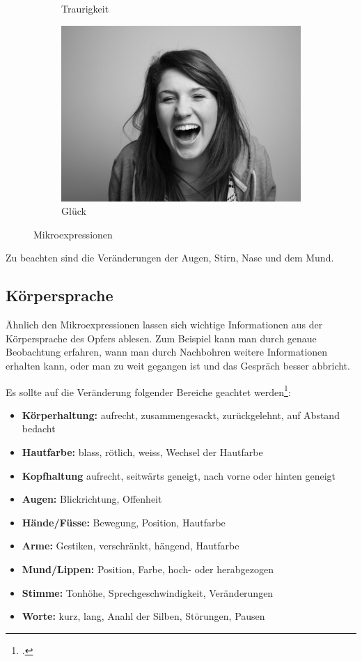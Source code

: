 \begin{figure}[htb]
\begin{subfigure}[b]{.30\linewidth}
		\caption{Traurigkeit}
		\label{fig:socialengineering:weiteretechniken:mikroexpressionen:traurigkeit}
	\end{subfigure}
	\begin{subfigure}[b]{.30\linewidth}
		\centering
		\includegraphics[width=0.5\linewidth]{images/mikroexpression-glueck.jpg}
		\caption{Glück}
		\label{fig:socialengineering:weiteretechniken:mikroexpressionen:glueck}
	\end{subfigure}
  \caption{Mikroexpressionen}
  \label{fig:socialengineering:weiteretechniken:mikroexpressionen}
\end{figure}

Zu beachten sind die Veränderungen der Augen, Stirn, Nase und dem Mund. 

\subsection{Körpersprache}
Ähnlich den Mikroexpressionen lassen sich wichtige Informationen aus der Körpersprache des Opfers ablesen. Zum Beispiel kann man durch genaue Beobachtung erfahren, wann man durch Nachbohren weitere Informationen erhalten kann, oder man zu weit gegangen ist und das Gespräch besser abbricht.

Es sollte auf die Veränderung folgender Bereiche geachtet werden\footcite{human_hacking}:
\begin{itemize}
\item \textbf{Körperhaltung:} aufrecht, zusammengesackt, zurückgelehnt, auf Abstand bedacht
\item \textbf{Hautfarbe:} blass, rötlich, weiss, Wechsel der Hautfarbe
\item \textbf{Kopfhaltung} aufrecht, seitwärts geneigt, nach vorne oder hinten geneigt
\item \textbf{Augen:} Blickrichtung, Offenheit
\item \textbf{Hände/Füsse:} Bewegung, Position, Hautfarbe
\item \textbf{Arme:} Gestiken, verschränkt, hängend, Hautfarbe
\item \textbf{Mund/Lippen:} Position, Farbe, hoch- oder herabgezogen
\item \textbf{Stimme:} Tonhöhe, Sprechgeschwindigkeit, Veränderungen
\item \textbf{Worte:} kurz, lang, Anahl der Silben, Störungen, Pausen
\end{itemize}

